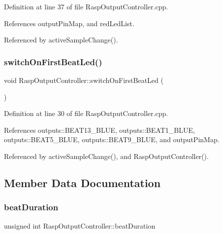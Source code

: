 Definition at line 37 of file Rasp\+Output\+Controller.\+cpp.



References output\+Pin\+Map, and red\+Led\+List.



Referenced by active\+Sample\+Change().

\mbox{\label{class_rasp_output_controller_a0cacbc3cbca8f1b78318234c6b74e576}} 
\subsubsection{\texorpdfstring{switch\+On\+First\+Beat\+Led()}{switchOnFirstBeatLed()}}
{\footnotesize\ttfamily void Rasp\+Output\+Controller\+::switch\+On\+First\+Beat\+Led (\begin{DoxyParamCaption}{ }\end{DoxyParamCaption})\hspace{0.3cm}{\ttfamily [private]}}



Definition at line 30 of file Rasp\+Output\+Controller.\+cpp.



References outputs\+::\+B\+E\+A\+T13\+\_\+\+B\+L\+UE, outputs\+::\+B\+E\+A\+T1\+\_\+\+B\+L\+UE, outputs\+::\+B\+E\+A\+T5\+\_\+\+B\+L\+UE, outputs\+::\+B\+E\+A\+T9\+\_\+\+B\+L\+UE, and output\+Pin\+Map.



Referenced by active\+Sample\+Change(), and Rasp\+Output\+Controller().



\subsection{Member Data Documentation}
\mbox{\label{class_rasp_output_controller_a8c6d21d4749ca4e767dcff93f2c6d7ac}} 
\subsubsection{\texorpdfstring{beat\+Duration}{beatDuration}}
{\footnotesize\ttfamily unsigned int Rasp\+Output\+Controller\+::beat\+Duration\hspace{0.3cm}{\ttfamily [private]}}



